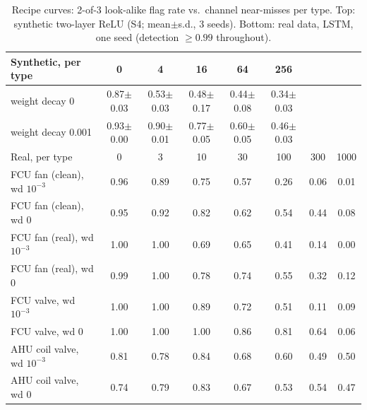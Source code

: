 \begin{table}[h]\centering\small
\caption{Recipe curves: 2-of-3 look-alike flag rate vs.\ channel near-misses per type. Top: synthetic two-layer ReLU (S4; mean$\pm$s.d., 3 seeds). Bottom: real data, LSTM, one seed (detection $\ge0.99$ throughout).}\label{tab:recipe}
\setlength{\tabcolsep}{3pt}\begin{tabular}{lccccccc}\toprule
Synthetic, per type & 0 & 4 & 16 & 64 & 256 & & \\\midrule
weight decay 0 & 0.87$\pm$0.03 & 0.53$\pm$0.03 & 0.48$\pm$0.17 & 0.44$\pm$0.08 & 0.34$\pm$0.03 & & \\
weight decay 0.001 & 0.93$\pm$0.00 & 0.90$\pm$0.01 & 0.77$\pm$0.05 & 0.60$\pm$0.05 & 0.46$\pm$0.03 & & \\
\midrule Real, per type & 0 & 3 & 10 & 30 & 100 & 300 & 1000\\\midrule
FCU fan (clean), wd $10^{-3}$ & 0.96 & 0.89 & 0.75 & 0.57 & 0.26 & 0.06 & 0.01\\
FCU fan (clean), wd 0 & 0.95 & 0.92 & 0.82 & 0.62 & 0.54 & 0.44 & 0.08\\
FCU fan (real), wd $10^{-3}$ & 1.00 & 1.00 & 0.69 & 0.65 & 0.41 & 0.14 & 0.00\\
FCU fan (real), wd 0 & 0.99 & 1.00 & 0.78 & 0.74 & 0.55 & 0.32 & 0.12\\
FCU valve, wd $10^{-3}$ & 1.00 & 1.00 & 0.89 & 0.72 & 0.51 & 0.11 & 0.09\\
FCU valve, wd 0 & 1.00 & 1.00 & 1.00 & 0.86 & 0.81 & 0.64 & 0.06\\
AHU coil valve, wd $10^{-3}$ & 0.81 & 0.78 & 0.84 & 0.68 & 0.60 & 0.49 & 0.50\\
AHU coil valve, wd 0 & 0.74 & 0.79 & 0.83 & 0.67 & 0.53 & 0.54 & 0.47\\
\bottomrule\end{tabular}\end{table}

